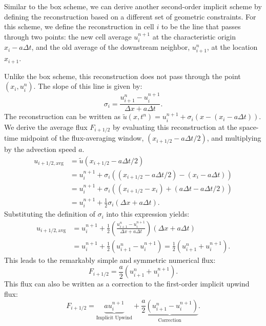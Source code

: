 Similar to the box scheme, we can derive another second-order implicit scheme by defining the reconstruction based on a different set of geometric constraints. For this scheme, we define the reconstruction in cell \(i\) to be the line that passes through two points: the new cell average \(u_i^{n+1}\) at the characteristic origin \(x_i - a\Delta t\), and the old average of the downstream neighbor, \(u_{i+1}^n\), at the location \(x_{i+1}\).

Unlike the box scheme, this reconstruction does not pass through the point \((x_i, u_i^n)\). The slope of this line is given by:
\begin{equation}
    \sigma_i = \frac{u_{i+1}^n - u_i^{n+1}}{\Delta x + a\Delta t}.
    \label{eq:iioe_slope}
\end{equation}
The reconstruction can be written as \(\tilde{u}(x, t^n) = u_i^{n+1} + \sigma_i(x - (x_i - a\Delta t))\). We derive the average flux \(F_{i+1/2}\) by evaluating this reconstruction at the space-time midpoint of the flux-averaging window, \((x_{i+1/2} - a\Delta t/2)\), and multiplying by the advection speed \(a\).
\begin{align*}
    u_{i+1/2, \text{avg}} &= \tilde{u}(x_{i+1/2} - a\Delta t/2) \\
    &= u_i^{n+1} + \sigma_i\left( (x_{i+1/2} - a\Delta t/2) - (x_i - a\Delta t) \right) \\
    &= u_i^{n+1} + \sigma_i\left( (x_{i+1/2} - x_i) + (a\Delta t - a\Delta t/2) \right) \\
    &= u_i^{n+1} + \frac{1}{2}\sigma_i(\Delta x + a\Delta t).
\end{align*}
Substituting the definition of \(\sigma_i\) into this expression yields:
\begin{equation*}
    \begin{split}
        u_{i+1/2, \text{avg}} &= u_i^{n+1} + \frac{1}{2}\left(\frac{u_{i+1}^n - u_i^{n+1}}{\Delta x + a\Delta t}\right)(\Delta x + a\Delta t)\\
                              &= u_i^{n+1} + \frac{1}{2}(u_{i+1}^n - u_i^{n+1}) = \frac{1}{2}(u_{i+1}^n + u_i^{n+1}).
    \end{split}
\end{equation*}
This leads to the remarkably simple and symmetric numerical flux:
\begin{equation}
    F_{i+1/2} = \frac{a}{2}(u_{i+1}^n + u_i^{n+1}).
\end{equation}
This flux can also be written as a correction to the first-order implicit upwind flux:
\begin{equation}
    F_{i+1/2} = \underbrace{a u_i^{n+1}}_{\text{Implicit Upwind}} + \underbrace{\frac{a}{2}(u_{i+1}^n - u_i^{n+1})}_{\text{Correction}}.
\end{equation}
